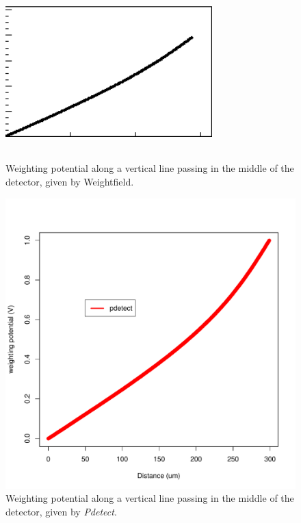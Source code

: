 \documentclass[11pt]{article}
\begin{document}
			\begin{figure}[H]
				\begin{minipage}[b]{.46\linewidth}
					\center
					\includegraphics[height=6cm, width=8cm]{images/boundary_conditions/weight_pot.png}
					\caption{Weighting potential along a vertical line passing in the middle of the detector,
							given by Weightfield.}
					\label{fig:weight_pot}
				\end{minipage} \hfill
				\begin{minipage}[b]{.46\linewidth}
				\center
					\includegraphics[scale=0.4]{images/boundary_conditions/free.pdf}
					\caption{Weighting potential along a vertical line passing in the middle of the detector,
							given by \textit{Pdetect}.}
					\label{fig:free_conditions}
					\end{minipage}
			\end{figure}
\end{document}
